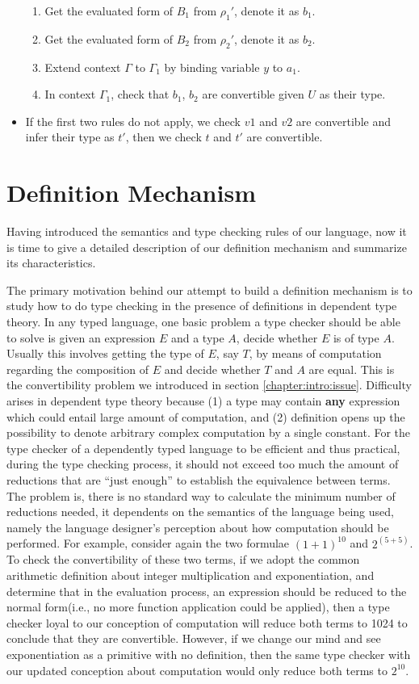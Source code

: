 \begin{itemize}
\begin{enumerate}
    \item Get the evaluated form of $B_1$ from $\rho_1'$, denote it as $b_1$.
    \item Get the evaluated form of $B_2$ from $\rho_2'$, denote it as $b_2$.
    \item Extend context $\Gamma$ to $\Gamma_1$ by binding variable $y$ to $a_1$.
    \item In context $\Gamma_1$, check that $b_1$, $b_2$ are convertible given $U$ as their type.
    \end{enumerate}
  \item If the first two rules do not apply, we check $v1$ and $v2$ are convertible and infer their type as $t'$, then we check $t$ and $t'$ are convertible.
\end{itemize}

\section{Definition Mechanism}
Having introduced the semantics and type checking rules of our language, now it is time to give a detailed description of our definition mechanism and summarize its characteristics.

The primary motivation behind our attempt to build a definition mechanism is to study how to do type checking in the presence of definitions in dependent type theory. In any typed language, one basic problem a type checker should be able to solve is given an expression $E$ and a type $A$, decide whether $E$ is of type $A$. Usually this involves getting the type of $E$, say $T$, by means of computation regarding the composition of $E$ and decide whether $T$ and $A$ are equal. This is the convertibility problem we introduced in section \ref{chapter:intro:issue}. Difficulty arises in dependent type theory because (1) a type may contain \textbf{any} expression which could entail large amount of computation, and (2) definition opens up the possibility to denote arbitrary complex computation by a single constant. For the type checker of a dependently typed language to be efficient and thus practical, during the type checking process, it should not exceed too much the amount of reductions that are ``just enough'' to establish the equivalence between terms. The problem is, there is no standard way to calculate the minimum number of reductions needed, it dependents on the semantics of the language being used, namely the language designer's perception about how computation should be performed. For example, consider again the two formulae $(1 + 1)^{10}$ and $2^{(5+5)}$. To check the convertibility of these two terms, if we adopt the common arithmetic definition about integer multiplication and exponentiation, and determine that in the evaluation process, an expression should be reduced to the normal form(i.e., no more function application could be applied), then a type checker loyal to our conception of computation will reduce both terms to 1024 to conclude that they are convertible. However, if we change our mind and see exponentiation as a primitive with no definition, then the same type checker with our updated conception about computation would only reduce both terms to $2^{10}$.


